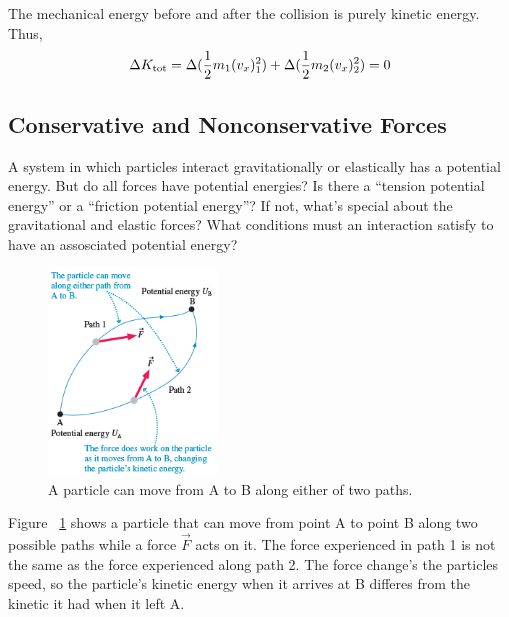 The mechanical energy before and after the collision is purely kinetic
energy.  Thus,
\begin{equation}
    \Delta K_{\mathrm{tot}} = \Delta( \frac{1}{2}m_1(v_x)_1^2 ) + \Delta( \frac{1}
    {2}m_2(v_x)_2^2 ) = 0
\end{equation}

\subsection{Conservative and Nonconservative Forces}

A system in which particles interact gravitationally or elastically has
a potential energy.  But do all forces have potential energies?  Is
there a ``tension potential energy'' or a ``friction potential energy''?
If not, what's special about the gravitational and elastic forces?  What
conditions must an interaction satisfy to have an assosciated potential
energy?

\begin{figure}
    \centering
    \includegraphics[width=0.4\textwidth]{../figures/two-possible-paths.png}
    \caption{A particle can move from A to B along either of two paths.}
    \label{fig:two-possible-paths}
\end{figure}

Figure~%
\ref{fig:two-possible-paths} shows a particle that can move from point A
to point B along two possible paths while a force
$
    \vec{F}
$ acts on it.  The force experienced in path 1 is not the same as the
force experienced along path 2.  The force change's the particles speed,
so the particle's kinetic energy when it arrives at B differes from the
kinetic it had when it left A.

